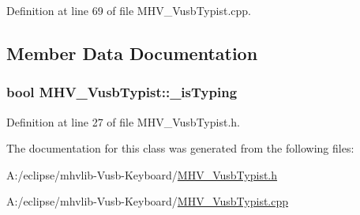 \-Definition at line 69 of file \-M\-H\-V\-\_\-\-Vusb\-Typist.\-cpp.



\subsection{\-Member \-Data \-Documentation}
\hypertarget{class_m_h_v___vusb_typist_a4c6b10764e87d062ec4fd70007959175}{
\subsubsection[{\-\_\-is\-Typing}]{\setlength{\rightskip}{0pt plus 5cm}bool {\bf \-M\-H\-V\-\_\-\-Vusb\-Typist\-::\-\_\-is\-Typing}}}
\label{class_m_h_v___vusb_typist_a4c6b10764e87d062ec4fd70007959175}


\-Definition at line 27 of file \-M\-H\-V\-\_\-\-Vusb\-Typist.\-h.



\-The documentation for this class was generated from the following files\-:\begin{DoxyCompactItemize}
\item 
\-A\-:/eclipse/mhvlib-\/\-Vusb-\/\-Keyboard/\hyperlink{_m_h_v___vusb_typist_8h}{\-M\-H\-V\-\_\-\-Vusb\-Typist.\-h}\item 
\-A\-:/eclipse/mhvlib-\/\-Vusb-\/\-Keyboard/\hyperlink{_m_h_v___vusb_typist_8cpp}{\-M\-H\-V\-\_\-\-Vusb\-Typist.\-cpp}\end{DoxyCompactItemize}
